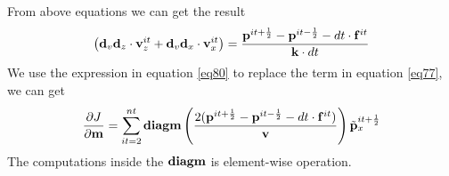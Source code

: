 \documentclass[revised,endfloat]{geophysics}
\begin{document}
From above equations we can get the result
\begin{equation}
 \left( {\bf d}_v{\bf d}_z \cdot {\bf v}_z^{it}+  {\bf d}_v{\bf d}_x \cdot {\bf v}_x^{it} \right) = 
 \frac{{\bf p}^{it+\frac{1}{2}} - {\bf p}^{it-\frac{1}{2}}  - dt \cdot {\bf f}^{it}}{{\bf k}\cdot dt}
 \label{eq80}
\end{equation}
We use the expression in equation \ref{eq80} to replace the term in equation \ref{eq77}, we can get
\begin{equation}
\frac{\partial J}{{\partial \bf m}} = \sum_{it=2}^{nt} {\bf diagm} \left( \frac{2({\bf p}^{it+\frac{1}{2}} - {\bf p}^{it-\frac{1}{2}}  - dt \cdot {\bf f}^{it})}{{\bf v}} \right) \tilde{{\bf p}}_x^{it+\frac{1}{2}} 
\label{eq81}
\end{equation}
The computations inside the ${\bf diagm}$ is element-wise operation.
\end{document}
